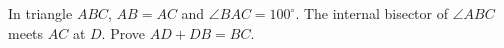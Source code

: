 In triangle $ABC$, $AB=AC$ and $\angle BAC=100^\circ$. The internal bisector of $\angle ABC$ meets $AC$ at $D$. Prove $AD+DB=BC$.
